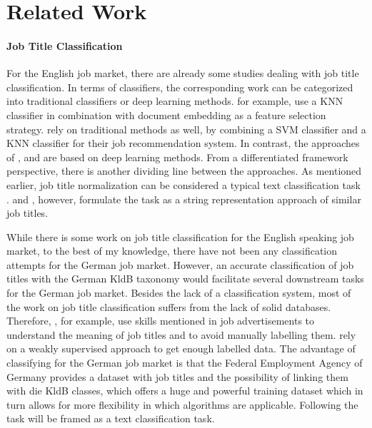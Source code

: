 \documentclass[12pt, a4paper, titlepage]{article}
\begin{document}
\section{Related Work}
\paragraph{Job Title Classification}
For the English job market, there are already some studies dealing with job title classification. In terms of classifiers, the corresponding work can be categorized into traditional classifiers or deep learning methods. \cite{zhu2017} for example, use a \ac{KNN} classifier in combination with document embedding as a feature selection strategy. \cite{javed2015} rely on traditional methods as well, by combining a \ac{SVM} classifier and a \ac{KNN} classifier for their job recommendation system. In contrast, the approaches of \cite{decorte2021}, \cite{wang2019} and \cite{neculoiu2016} are based on deep learning methods. From a differentiated framework perspective, there is another dividing line between the approaches. As mentioned earlier, job title normalization can be considered a typical text classification task \citep{wang2019, javed2015, zhu2017}. \cite{decorte2021} and \cite{neculoiu2016}, however, formulate the task as a string representation approach of similar job titles. 

While there is some work on job title classification for the English speaking job market, to the best of my knowledge, there have not been any classification attempts for the German job market. However, an accurate classification of job titles with the German \ac{KldB} taxonomy would facilitate several downstream tasks for the German job market. Besides the lack of a classification system, most of the work on job title classification suffers from the lack of solid databases. Therefore, \cite{decorte2021}, for example, use skills mentioned in job advertisements to understand the meaning of job titles and to avoid manually labelling them. \cite{javed2015} rely on a weakly supervised approach to get enough labelled data. The advantage of classifying for the German job market is that the Federal Employment Agency of Germany provides a dataset with job titles and the possibility of linking them with die \ac{KldB} classes, which offers a huge and powerful training dataset which in turn allows for more flexibility in which algorithms are applicable. Following \citet{wang2019, javed2015, zhu2017} the task will be framed as a text classification task. 
\end{document}

